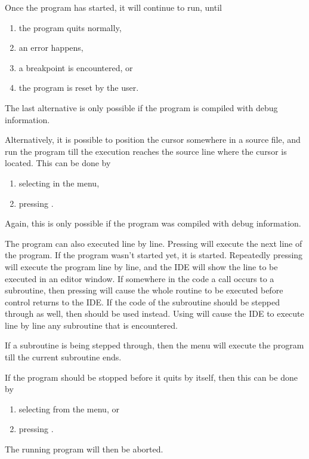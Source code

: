 
Once the program has started, it will continue to run, until
\begin{enumerate}
\item the program quits normally,
\item an error happens,
\item a breakpoint is encountered, or
\item the program is reset by the user.
\end{enumerate}
The last alternative is only possible if the program is compiled
with debug information.

Alternatively, it is possible to position the cursor somewhere in a
source file, and run the program till the execution reaches the
source line where the cursor is located. This can be done by
\begin{enumerate}
\item selecting  in the menu,
\item pressing .
\end{enumerate}
Again, this is only possible if the program was compiled with debug
information.

The program can also executed line by line. Pressing  will
execute the next line of the program. If the program wasn't started
yet, it is started. Repeatedly pressing  will execute the program
line by line, and the IDE will show the line to be executed
in an editor window. If somewhere in the code a call occurs to a subroutine,
then pressing  will cause the whole routine to be executed before
control returns to the IDE. If the code of the subroutine should be stepped
through as well, then  should be used instead. Using  will
cause the IDE to execute line by line any subroutine that is encountered.

If a subroutine is being stepped through, then the  menu
will execute the program till the current subroutine ends.

If the program should be stopped before it quits by itself, then this can be
done by
\begin{enumerate}
\item selecting  from the menu, or
\item pressing .
\end{enumerate}
The running program will then be aborted.

